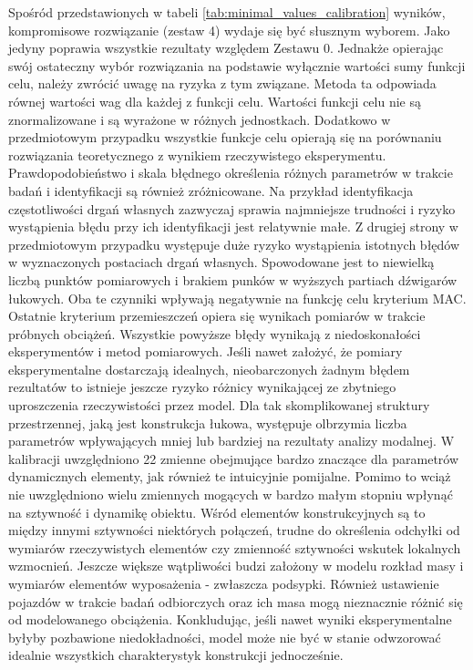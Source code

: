 Spośród przedstawionych w tabeli \ref{tab:minimal_values_calibration} wyników, kompromisowe rozwiązanie (zestaw 4) wydaje się być słusznym wyborem. Jako jedyny poprawia wszystkie rezultaty względem Zestawu 0. Jednakże opierając swój ostateczny wybór rozwiązania na podstawie wyłącznie wartości sumy funkcji celu, należy zwrócić uwagę na ryzyka z tym związane. Metoda ta odpowiada równej wartości wag dla każdej z funkcji celu. Wartości funkcji celu nie są znormalizowane i są wyrażone w różnych jednostkach. Dodatkowo w przedmiotowym przypadku wszystkie funkcje celu opierają się na porównaniu rozwiązania teoretycznego z wynikiem rzeczywistego eksperymentu. Prawdopodobieństwo i skala błędnego określenia różnych parametrów w trakcie badań i identyfikacji są również zróżnicowane. Na przykład identyfikacja częstotliwości drgań własnych zazwyczaj sprawia najmniejsze trudności i ryzyko wystąpienia błędu przy ich identyfikacji jest relatywnie małe. Z drugiej strony w przedmiotowym przypadku występuje duże ryzyko wystąpienia istotnych błędów w wyznaczonych postaciach drgań własnych. Spowodowane jest to niewielką liczbą punktów pomiarowych i brakiem punków w wyższych partiach dźwigarów łukowych. Oba te czynniki wpływają negatywnie na funkcję celu kryterium MAC. Ostatnie kryterium przemieszczeń opiera się wynikach pomiarów w trakcie próbnych obciążeń. Wszystkie powyższe błędy wynikają z niedoskonałości eksperymentów i metod pomiarowych. Jeśli nawet założyć, że pomiary eksperymentalne dostarczają idealnych, nieobarczonych żadnym błędem rezultatów to istnieje jeszcze ryzyko różnicy wynikającej ze zbytniego uproszczenia rzeczywistości przez model. Dla tak skomplikowanej struktury przestrzennej, jaką jest konstrukcja łukowa, występuje olbrzymia liczba parametrów wpływających mniej lub bardziej na rezultaty analizy modalnej. W kalibracji uwzględniono 22 zmienne obejmujące bardzo znaczące dla parametrów dynamicznych elementy, jak również te intuicyjnie pomijalne. Pomimo to wciąż nie uwzględniono wielu zmiennych mogących w bardzo małym stopniu wpłynąć na sztywność i dynamikę obiektu. Wśród elementów konstrukcyjnych są to między innymi sztywności niektórych połączeń, trudne do określenia odchyłki od wymiarów rzeczywistych elementów czy zmienność sztywności wskutek lokalnych wzmocnień. Jeszcze większe wątpliwości budzi założony w modelu rozkład masy i wymiarów elementów wyposażenia - zwłaszcza podsypki. Również ustawienie pojazdów w trakcie badań odbiorczych oraz ich masa mogą nieznacznie różnić się od modelowanego obciążenia. Konkludując, jeśli nawet wyniki eksperymentalne byłyby pozbawione niedokładności, model może nie być w stanie odwzorować idealnie wszystkich charakterystyk konstrukcji jednocześnie.

